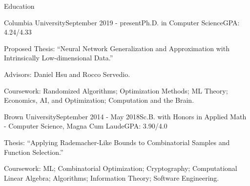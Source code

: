 \documentclass{resume} %
\begin{document}

\begin{rSection}{Education}
\begin{rSubsection}{Columbia University}{September 2019 - present}{Ph.D. in Computer Science}{GPA: 4.24/4.33}
\item Proposed Thesis: ``Neural Network Generalization and Approximation with Intrinsically Low-dimensional Data.''
\item Advisors: Daniel Hsu and Rocco Servedio.
\item Coursework: Randomized Algorithms; Optimization Methods; ML Theory; Economics, AI, and Optimization; Computation and the Brain.
\end{rSubsection}

\begin{rSubsection}{Brown University}{September 2014 - May 2018}{Sc.B. with Honors in Applied Math - Computer Science, Magna Cum Laude}{GPA: 3.90/4.0}
\item Thesis: ``Applying Rademacher-Like Bounds to Combinatorial Samples and Function Selection.''
\item Coursework: ML; Combinatorial Optimization; Cryptography; Computational Linear Algebra; Algorithms; Information Theory; Software Engineering.
\end{rSubsection}


\end{rSection}




\end{document}
